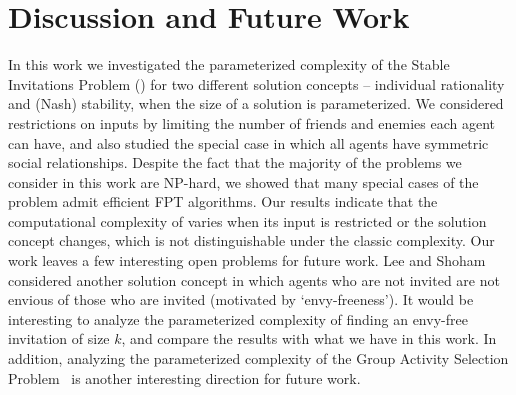 \section{Discussion and Future Work} \label{SIP:sec:discussion}
In this work we investigated the parameterized complexity of the Stable Invitations Problem (\SIP) for two different solution concepts -- individual rationality and (Nash) stability, when the size of a solution is parameterized.
We considered restrictions on inputs by limiting the number of friends and enemies each agent can have, and also studied the special case in which all agents have symmetric social relationships.
Despite the fact that the majority of the problems we consider in this work are NP-hard, we showed that many special cases of the problem admit efficient FPT algorithms.
Our results indicate that the computational complexity of \SIPs varies when its input is restricted or the solution concept changes, which is not distinguishable under the classic complexity.
Our work leaves a few interesting open problems for future work. 
Lee and Shoham~\cite{LEE15AAAI} considered another solution concept in which agents who are not invited are not envious of those who are invited (motivated by `envy-freeness'). It would be interesting to analyze the parameterized complexity of finding an envy-free invitation of size $k$, and compare the results with what we have in this work. In addition, analyzing the parameterized complexity of the Group Activity Selection Problem~\cite{GASP12WINE} is another interesting direction for future work. 


